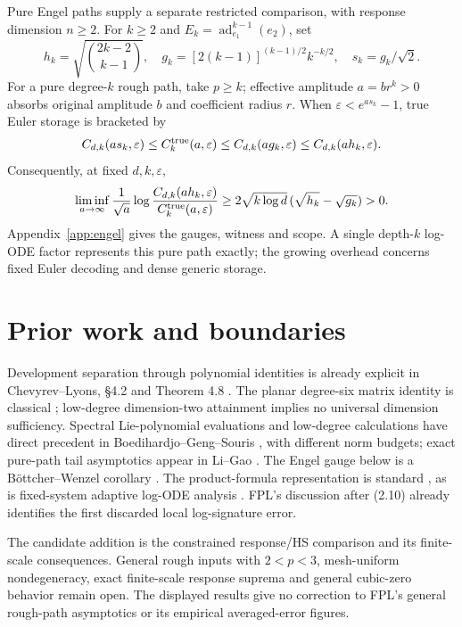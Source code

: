 \documentclass[11pt,a4paper]{article}
\DeclareMathOperator{\ad}{ad}
\begin{document}
Pure Engel paths supply a separate restricted comparison, with response
dimension \(n\ge2\). For \(k\ge2\) and
\(E_k=\ad_{e_1}^{k-1}(e_2)\), set
\[
 h_k=\sqrt{\binom{2k-2}{k-1}},\quad
 g_k=[2(k-1)]^{(k-1)/2}k^{-k/2},\quad s_k=g_k/\sqrt2.
\]
For a pure degree-\(k\) rough path, take \(p\ge k\); effective amplitude
\(a=br^k>0\) absorbs original amplitude \(b\) and coefficient radius \(r\).
When \(\varepsilon<e^{a s_k}-1\), true Euler storage is bracketed by
\[
 C_{d,k}(a s_k,\varepsilon)\le C_k^{\rm true}(a,\varepsilon)
 \le C_{d,k}(a g_k,\varepsilon)\le C_{d,k}(a h_k,\varepsilon).
\]
Consequently, at fixed \(d,k,\varepsilon\),
\[
 \liminf_{a\to\infty}\frac1{\sqrt a}
 \log\frac{C_{d,k}(a h_k,\varepsilon)}{C_k^{\rm true}(a,\varepsilon)}
 \ge2\sqrt{k\log d}\,(\sqrt{h_k}-\sqrt{g_k})>0.
\]
Appendix~\ref{app:engel} gives the gauges, witness and scope.
A single depth-\(k\) log-ODE factor represents this pure path exactly;
the growing overhead concerns fixed Euler decoding and dense generic storage.

\section{Prior work and boundaries}
Development separation through polynomial identities is already explicit in
Chevyrev--Lyons, \S4.2 and Theorem 4.8 \cite{chevyrev2016characteristic}.
The planar degree-six matrix identity is classical \cite{nikolaev1986two};
low-degree dimension-two attainment implies no universal dimension sufficiency.
Spectral Lie-polynomial evaluations and low-degree calculations have direct
precedent in Boedihardjo--Geng--Souris \cite{boedihardjo2020developments},
with different norm budgets; exact pure-path tail asymptotics appear in
Li--Gao \cite{li2026exact}. The Engel gauge below is a
B\"ottcher--Wenzel corollary \cite{bottcher2008frobenius}.
The product-formula representation is standard
\cite{iserles2024elementary}, as is fixed-system adaptive log-ODE analysis
\cite{bayer2023adaptive}. FPL's discussion after (2.10) already identifies
the first discarded local log-signature error.

The candidate addition is the constrained response/HS comparison and its
finite-scale consequences. General rough inputs with \(2<p<3\), mesh-uniform
nondegeneracy, exact finite-scale response suprema and general cubic-zero
behavior remain open. The displayed results give no correction to FPL's
general rough-path asymptotics or its empirical averaged-error figures.

\clearpage
\appendix
\end{document}
